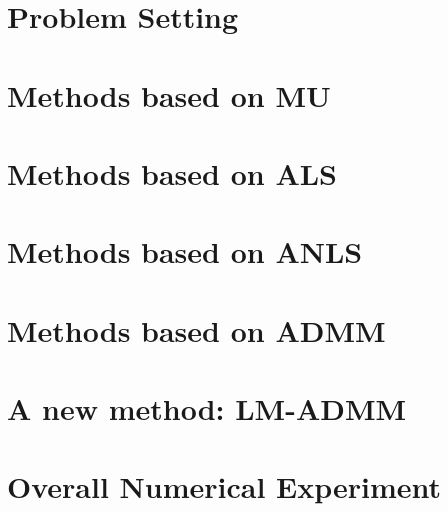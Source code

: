 \documentclass{article}
\begin{document}
	\maketitle
	\thispagestyle{fancy}
	\tableofcontents
	
	\section*{}



\section{Problem Setting}


\section{Methods based on MU}

\section{Methods based on ALS}


\section{Methods based on ANLS}

\section{Methods based on ADMM}

\section{A new method: LM-ADMM}


\section{Overall Numerical Experiment}
\end{document}

